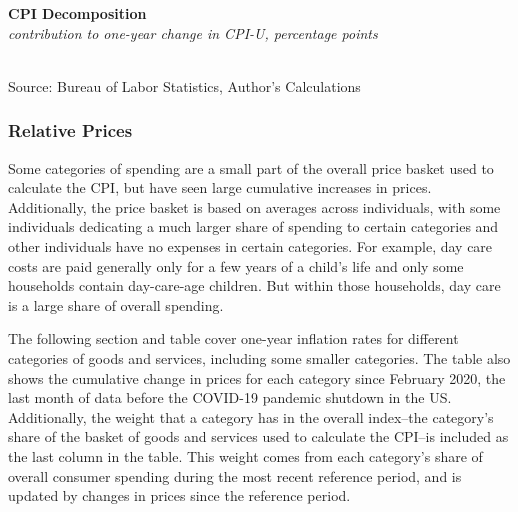 \documentclass{report}
\makeatletter
\newcommand{\tbllink}[1]{\href{https://raw.githubusercontent.com/bdecon/US-chartbook/master/chartbook/data/#1}{\faTable}}
\newcommand*\short[1]{\expandafter\@gobbletwo\number\numexpr#1\relax}
\newcommand{\ctsbar}[5]{
		\addplot[ybar stacked, bar width=#5, draw opacity=0, fill=#1] 
			table [x=#2, y=#3, col sep=comma]{#4};}
\newcommand{\tydateaxisticks}{
		date coordinates in=x, axis line style={draw=none},
		xmax={2022-03-15}, max space between ticks=40,	    
		xtick={{2011-01-01}, {2012-01-01}, {2013-01-01}, {2014-01-01}, {2015-01-01}, {2016-01-01}, 
			{2017-01-01}, {2018-01-01}, {2019-01-01}, {2020-01-01}, {2021-01-01}, {2022-01-01}},
		enlarge y limits={0.06}, enlarge x limits={0.01},
		}
\newcommand{\bbar}[2]{extra #1 ticks = {{#2}}, extra #1 tick labels = ,
		extra #1 tick style = {grid=major, grid style={thick, black!25}},}
\newcommand{\rbars}{
		\fill[color=black!10] (axis cs:{1990-07-01},\pgfkeysvalueof{/pgfplots/ymin}) rectangle 
			(axis cs:{1991-03-01}, \pgfkeysvalueof{/pgfplots/ymax});
		\fill[color=black!10] (axis cs:{2007-12-01},\pgfkeysvalueof{/pgfplots/ymin}) rectangle 
			(axis cs:{2009-07-01}, \pgfkeysvalueof{/pgfplots/ymax});
		\fill[color=black!10] (axis cs:{2001-03-01},\pgfkeysvalueof{/pgfplots/ymin}) rectangle 
			(axis cs:{2001-11-01}, \pgfkeysvalueof{/pgfplots/ymax});
		\fill[color=black!10] (axis cs:{2020-02-01},\pgfkeysvalueof{/pgfplots/ymin}) rectangle 
			(axis cs:{2020-05-01}, \pgfkeysvalueof{/pgfplots/ymax});}
\makeatother
\begin{document}
{{\begin{minipage}{0.76\textwidth}

\vspace{1mm}

\normalsize \textbf{CPI Decomposition}\\
\footnotesize{\textit{contribution to one-year change in CPI-U, percentage points}}\\
\hspace*{-2mm} \\
\footnotesize{Source: Bureau of Labor Statistics, Author's Calculations} \hfill \tbllink{cpi_decomp.csv}
\vspace{4mm}

\subsubsection*{Relative Prices}
\small Some categories of spending are a small part of the overall price basket used to calculate the CPI, but have seen large cumulative increases in prices. Additionally, the price basket is based on averages across individuals, with some individuals dedicating a much larger share of spending to certain categories and other individuals have no expenses in certain categories. For example, day care costs are paid generally only for a few years of a child's life and only some households contain day-care-age children. But within those households, day care is a large share of overall spending. 

The following section and table cover one-year inflation rates for different categories of goods and services, including some smaller categories. The table also shows the cumulative change in prices for each category since February 2020, the last month of data before the COVID-19 pandemic shutdown in the US. Additionally, the weight that a category has in the overall index--the category's share of the basket of goods and services used to calculate the CPI--is included as the last column in the table. This weight comes from each category's share of overall consumer spending during the most recent reference period, and is updated by changes in prices since the reference period. 
\end{minipage}
\newpage
\begin{minipage}{0.76\textwidth}
\small 
\vspace{1.5mm}


\end{minipage}}}
\end{document}
